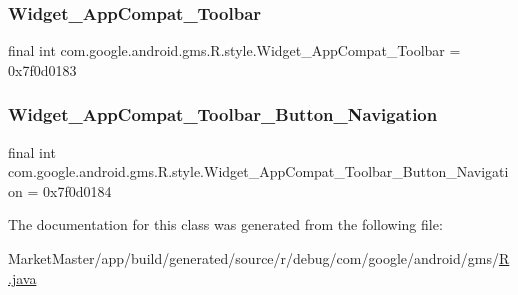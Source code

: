 \subsubsection{\texorpdfstring{Widget\+\_\+\+App\+Compat\+\_\+\+Toolbar}{Widget\_AppCompat\_Toolbar}}
{\footnotesize\ttfamily final int com.\+google.\+android.\+gms.\+R.\+style.\+Widget\+\_\+\+App\+Compat\+\_\+\+Toolbar = 0x7f0d0183\hspace{0.3cm}{\ttfamily [static]}}

\mbox{\label{classcom_1_1google_1_1android_1_1gms_1_1R_1_1style_aef2f545e87aa33e9c37b8e5572ebeef5}} 
\subsubsection{\texorpdfstring{Widget\+\_\+\+App\+Compat\+\_\+\+Toolbar\+\_\+\+Button\+\_\+\+Navigation}{Widget\_AppCompat\_Toolbar\_Button\_Navigation}}
{\footnotesize\ttfamily final int com.\+google.\+android.\+gms.\+R.\+style.\+Widget\+\_\+\+App\+Compat\+\_\+\+Toolbar\+\_\+\+Button\+\_\+\+Navigation = 0x7f0d0184\hspace{0.3cm}{\ttfamily [static]}}



The documentation for this class was generated from the following file\+:\begin{DoxyCompactItemize}
\item 
Market\+Master/app/build/generated/source/r/debug/com/google/android/gms/\mbox{\hyperlink{debug_2com_2google_2android_2gms_2R_8java}{R.\+java}}\end{DoxyCompactItemize}
